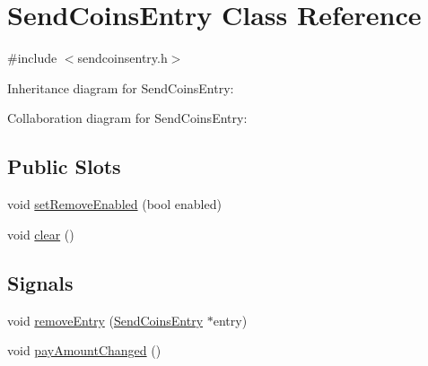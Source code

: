 \hypertarget{class_send_coins_entry}{}\section{Send\+Coins\+Entry Class Reference}
\label{class_send_coins_entry}


{\ttfamily \#include $<$sendcoinsentry.\+h$>$}



Inheritance diagram for Send\+Coins\+Entry\+:


Collaboration diagram for Send\+Coins\+Entry\+:
\subsection*{Public Slots}
\begin{DoxyCompactItemize}
\item 
void \hyperlink{class_send_coins_entry_ab4a8df95b2081b2c7c7cf40bebbcea5c}{set\+Remove\+Enabled} (bool enabled)
\item 
void \hyperlink{class_send_coins_entry_abff66fcd456c82144e7a2c410f5082ac}{clear} ()
\end{DoxyCompactItemize}
\subsection*{Signals}
\begin{DoxyCompactItemize}
\item 
void \hyperlink{class_send_coins_entry_a9105a4f91781f96b91a1da65da9032bf}{remove\+Entry} (\hyperlink{class_send_coins_entry}{Send\+Coins\+Entry} $\ast$entry)
\item 
void \hyperlink{class_send_coins_entry_a9f4fec53927c3ddd37ccea53f8d1e370}{pay\+Amount\+Changed} ()
\end{DoxyCompactItemize}

